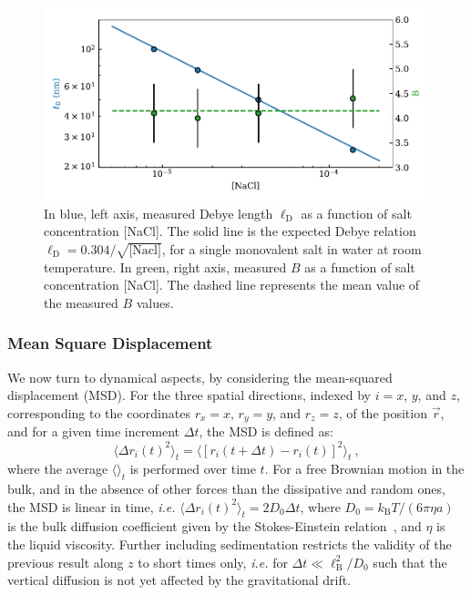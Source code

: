  \begin{figure}[H]
 	\centering
 	\includegraphics{02_body/chapter3/images/trajctory_analysis/ld.pdf}
 	\caption{In blue, left axis, measured Debye length $\ell_\mathrm{D}$ as a function of salt concentration [NaCl]. The solid line is the expected Debye relation $\ell_\mathrm{D}=0.304/\sqrt{\textrm{[Nacl]}}$, for a single monovalent salt in water at room temperature. In green, right axis, measured $B$ as a function of salt  concentration [NaCl]. The dashed line represents the mean value of the measured $B$ values.}
 	\label{fig.ld}
 \end{figure}


\subsubsection{Mean Square Displacement}

We now turn to dynamical aspects, by considering the mean-squared displacement (MSD). For the three spatial directions, indexed by $i=x$, $y$, and $z$, corresponding to the coordinates $r_x=x$, $r_y=y$, and $r_z=z$, of the position $\vec{r}$, and for a given time increment $\Delta t$, the MSD is defined as:
\begin{equation}
	\langle\Delta r_i(t)^2 \rangle_t = \langle[r_i(t+\Delta t) - r_i(t)]^2\rangle_t\ ,
	\label{MSDdef}
\end{equation}
where the average $\langle\rangle_t$ is performed over time $t$. For a free Brownian motion in the bulk, and in the absence of other forces than the dissipative and random ones, the \gls{MSD} is linear in time, \textit{i.e.} $\langle\Delta r_i(t)^2 \rangle_t = 2 D_0 \Delta t$, where $D_0=k_\mathrm{B}T/(6\pi\eta a)$ is the bulk diffusion coefficient given by the Stokes-Einstein relation~\cite{einstein_uber_1905}, and $\eta$ is the liquid viscosity. Further including sedimentation restricts the validity of the previous result along $z$ to short times only, \textit{i.e.} for $\Delta t\ll\ell_{\textrm{B}}^2/D_0$ such that the vertical diffusion is not yet affected by the gravitational drift.

